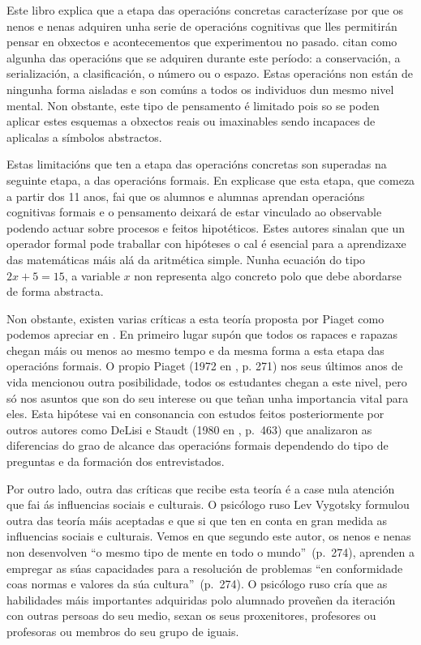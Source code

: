 Este libro explica que a etapa das operacións concretas caracterízase por que os nenos e nenas adquiren unha serie de operacións cognitivas que lles permitirán pensar en obxectos e acontecementos que experimentou no pasado.  citan como algunha das operacións que se adquiren durante este período: a conservación, a serialización, a clasificación, o número ou o espazo. Estas operacións non están de ningunha forma aisladas e son comúns a todos os individuos dun mesmo nivel mental. Non obstante, este tipo de pensamento é limitado pois so se poden aplicar estes esquemas a obxectos reais ou imaxinables sendo incapaces de aplicalas a símbolos abstractos.

Estas limitacións que ten a etapa das operacións concretas son superadas na seguinte etapa, a das operacións formais. En  explicase que esta etapa, que comeza a partir dos 11 anos, fai que os alumnos e alumnas aprendan operacións cognitivas formais e o pensamento deixará de estar vinculado ao observable podendo actuar sobre procesos e feitos hipotéticos. Estes autores sinalan que un operador formal pode traballar con hipóteses o cal é esencial para a aprendizaxe das matemáticas máis alá da aritmética simple. Nunha ecuación do tipo $2x + 5 = 15$, a variable $x$ non representa algo concreto polo que debe abordarse de forma abstracta.

Non obstante, existen varias críticas a esta teoría proposta por Piaget como podemos apreciar en . En primeiro lugar supón que todos os rapaces e rapazas chegan máis ou menos ao mesmo tempo e da mesma forma a esta etapa das operacións formais. O propio Piaget (1972 en , p. 271) nos seus últimos anos de vida mencionou outra posibilidade, todos os estudantes chegan a este nivel, pero só nos asuntos que son do seu interese ou que teñan unha importancia vital para eles. Esta hipótese vai en consonancia con estudos feitos posteriormente por outros autores como DeLisi e Staudt (1980 en , p.~463) que analizaron as diferencias do grao de alcance das operacións formais dependendo do tipo de preguntas e da formación dos entrevistados.

Por outro lado, outra das críticas que recibe esta teoría é a case nula atención que fai ás influencias sociais e culturais. O psicólogo ruso Lev Vygotsky formulou outra das teoría máis aceptadas e que si que ten en conta en gran medida as influencias sociais e culturais. Vemos en  que segundo este autor, os nenos e nenas non desenvolven ``o mesmo tipo de mente en todo o mundo''~(p.~274), aprenden a empregar as súas capacidades para a resolución de problemas ``en conformidade coas normas e valores da súa cultura''~(p.~274). O psicólogo ruso cría que as habilidades máis importantes adquiridas polo alumnado proveñen da iteración con outras persoas do seu medio, sexan os seus proxenitores, profesores ou profesoras ou membros do seu grupo de iguais.

